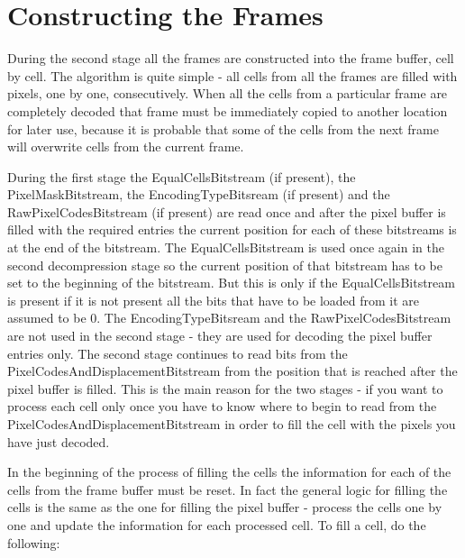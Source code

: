 \section{Constructing the Frames}
During the second stage all the frames are constructed into the frame buffer, 
cell by cell. The algorithm is quite simple - all cells from all the frames are 
filled with pixels, one by one, consecutively. When all the cells from a 
particular frame are completely decoded that frame must be immediately copied to 
another location for later use, because it is probable that some of the cells 
from the next frame will overwrite cells from the current frame.

During the first stage the EqualCellsBitstream (if present), the 
PixelMaskBitstream, the EncodingTypeBitsream (if present) and the 
RawPixelCodesBitstream (if present) are read once and after the pixel buffer is 
filled with the required entries the current position for each of these 
bitstreams is at the end of the bitstream. The EqualCellsBitstream is used once 
again in the second decompression stage so the current position of that 
bitstream has to be set to the beginning of the bitstream. But this is only if 
the EqualCellsBitstream is present if it is not present all the bits that have 
to be loaded from it are assumed to be 0. The EncodingTypeBitsream and the 
RawPixelCodesBitstream are not used in the second stage - they are used for 
decoding the pixel buffer entries only. The second stage continues to read bits 
from the PixelCodesAndDisplacementBitstream from the position that is reached 
after the pixel buffer is filled. This is the main reason for the two stages - 
if you want to process each cell only once you have to know where to begin to 
read from the PixelCodesAndDisplacementBitstream in order to fill the cell with 
the pixels you have just decoded.

In the beginning of the process of filling the cells the information for each of 
the cells from the frame buffer must be reset. In fact the general logic for 
filling the cells is the same as the one for filling the pixel buffer - process 
the cells one by one and update the information for each processed cell. To fill 
a cell, do the following:

